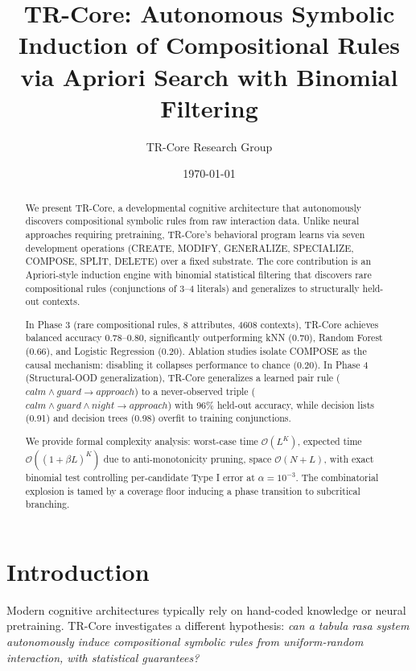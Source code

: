 \documentclass[11pt]{article}
\title{TR-Core: Autonomous Symbolic Induction of Compositional Rules via Apriori Search with Binomial Filtering}
\author{TR-Core Research Group}
\date{\today}
\newcommand{\Oh}{\mathcal{O}}
\begin{document}
\maketitle

\begin{abstract}
We present TR-Core, a developmental cognitive architecture that autonomously discovers compositional symbolic rules from raw interaction data. Unlike neural approaches requiring pretraining, TR-Core's behavioral program learns via seven development operations (CREATE, MODIFY, GENERALIZE, SPECIALIZE, COMPOSE, SPLIT, DELETE) over a fixed substrate. The core contribution is an Apriori-style induction engine with binomial statistical filtering that discovers rare compositional rules (conjunctions of 3--4 literals) and generalizes to structurally held-out contexts. 

In Phase 3 (rare compositional rules, 8 attributes, 4608 contexts), TR-Core achieves balanced accuracy 0.78--0.80, significantly outperforming kNN (0.70), Random Forest (0.66), and Logistic Regression (0.20). Ablation studies isolate COMPOSE as the causal mechanism: disabling it collapses performance to chance (0.20). In Phase 4 (Structural-OOD generalization), TR-Core generalizes a learned pair rule ($calm \land guard \to approach$) to a never-observed triple ($calm \land guard \land night \to approach$) with 96\% held-out accuracy, while decision lists (0.91) and decision trees (0.98) overfit to training conjunctions. 

We provide formal complexity analysis: worst-case time $\Oh(L^K)$, expected time $\Oh((1+\beta L)^K)$ due to anti-monotonicity pruning, space $\Oh(N + L)$, with exact binomial test controlling per-candidate Type I error at $\alpha=10^{-3}$. The combinatorial explosion is tamed by a coverage floor inducing a phase transition to subcritical branching.
\end{abstract}

\section{Introduction}
\label{sec:intro}

Modern cognitive architectures \cite{laird2019soar, langley2009cognitive, goertzel2014opencog} typically rely on hand-coded knowledge or neural pretraining. TR-Core investigates a different hypothesis: \emph{can a tabula rasa system autonomously induce compositional symbolic rules from uniform-random interaction, with statistical guarantees?}
\end{document}

